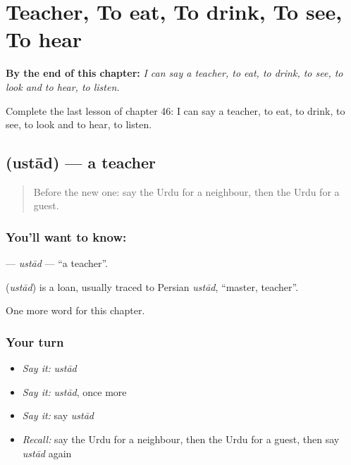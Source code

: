 
\chapter{Teacher, To eat, To drink, To see, To hear}
\label{ch:ur-teacher-to-eat-to-drink-to-see-to-hear}

\begin{chapteropening}
\textbf{By the end of this chapter:} \emph{I can say a teacher, to eat, to drink, to see, to look and to hear, to listen.}

Complete the last lesson of chapter 46: I can say a teacher, to eat, to drink, to see, to look and to hear, to listen.
\end{chapteropening}

\section[\texorpdfstring{\ur{استاد} (ustād)}{استاد (ustād)}]{ (ustād) — a teacher}

\label{lesson:UR-C46-ustad}



\begin{quote}
Before the new one: say the Urdu for a neighbour, then the Urdu for a guest.
\end{quote}

\subsection*{You'll want to know: }
\textbf{} — \emph{ustād} — \textquotedblleft{}a teacher\textquotedblright{}.

\begin{cousinweb}
\textbf{} (\emph{ustād}) is a loan, usually traced to Persian \emph{ustād}, \textquotedblleft{}master, teacher\textquotedblright{}.
\end{cousinweb}

\begin{grammarlens}[title={What you've built}]
One more word for this chapter.
\end{grammarlens}

\subsection*{Your turn}
\begin{itemize}
\raggedright
  \item \emph{Say it:} \emph{ustād}
  \item \emph{Say it:} \emph{ustād}, once more
  \item \emph{Say it:} say \emph{ustād}
  \item \emph{Recall:} say the Urdu for a neighbour, then the Urdu for a guest, then say \emph{ustād} again
\end{itemize}

